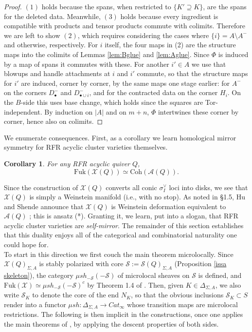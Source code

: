 \documentclass[11pt]{amsart}
\newtheorem{cor}[thm]{Corollary}
\theoremstyle{definition}
\theoremstyle{remark}
\newcommand{\Coh}{\mathrm{Coh}}
\newcommand{\Fuk}{\mathrm{Fuk}}
\numberwithin{equation}{section}
\begin{document}
\begin{proof}
$(1)$ holds because the spans, when restricted to $\{K'\supseteq K\}$, are the spans for the deleted data. Meanwhile, $(3)$ holds because every ingredient is compatible with products and tensor products commute with colimits. Therefore we are left to show $(2)$, which requires considering the cases where $\{i\} = A \setminus A^-$ and otherwise, respectively. For $i$ itself, the four maps in (2) are the structure maps into the colimits of Lemmas \ref{lem:Bglue} and \ref{lem:Aglue}. Since $\Phi$ is induced by a map of spans it commutes with these. For another $i'\in A$ we use that blowups and handle attachments at $i$ and $i'$ commute, so that the structure maps for $i'$ are induced, corner by corner, by the same maps one stage earlier: for $A^-$ on the corners $D^-_\bullet$ and $D^-_{\bullet\cup i}$, and for the contracted data on the corner $H_i$. On the $B$-side this uses base change, which holds since the squares are Tor-independent. By induction on $|A|$ and on $m+n$, $\Phi$ intertwines these corner by corner, hence also on colimits.
\end{proof}

We enumerate consequences. First, as a corollary we learn homological mirror symmetry for RFR acyclic cluster varieties themselves.

\begin{cor}
    For any RFR acyclic quiver $Q$, $$\Fuk(\mathcal{X}(Q)) \simeq \Coh(\mathcal{A}(Q)).$$\end{cor} 
    
    Since the construction of $\mathcal{X}(Q)$ converts all conic $\sigma_I^\vee$ loci into disks, we see that $\mathcal{X}(Q)$ is simply a Weinstein manifold (i.e., with no stop). As noted in §1.5, Hu and Shende announce that $\mathcal X(Q)$ is Weinstein deformation equivalent to $\mathcal A(Q)$ \cite{HS}; this is ansatz (*). Granting it, we learn, put into a slogan, that RFR acyclic cluster varieties are \textit{self-mirror}. The remainder of this section establishes that this duality enjoys all of the categorical and combinatorial naturality one could hope for.\\

    To start in this direction we first couch the main theorem microlocally. Since $\mathcal{X}(Q)_{\Sigma,A}$ is stably polarized with core $\mathcal{S} := \mathcal{S}(Q)_{\Sigma,A}$ (Proposition \ref{issa skeleton}), the category $\mu sh_{-\mathcal{S}}(-\mathcal{S})$ of microlocal sheaves on $\mathcal{S}$ is defined, and $\mathrm{Fuk}(\mathcal{X}) \simeq \mu sh_{-\mathcal{S}}(-\mathcal{S})^c$ by Theorem 1.4 of \cite{GPSIII}. Then, given $K \in \Delta_{\Sigma, A}$, we also write $\mathcal{S}_K$ to denote the core of the end $N_K$, so that the obvious inclusions $\mathcal
    S_K \subset S$ render into a functor $\mu sh: \Delta_{\Sigma, A} \rightarrow Cat_\infty$ whose transition maps are microlocal restrictions. The following is then implicit in the constructions, once one applies the main theorems of \cite{GPSIII}, by applying the descent properties of both sides.
\end{document}
